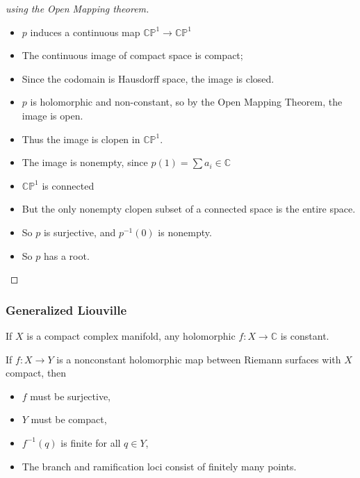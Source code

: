 \begin{proof}[using the Open Mapping theorem]

\envlist

\begin{itemize}
\tightlist
\item
  \(p\) induces a continuous map \({\mathbb{CP}}^1 \to {\mathbb{CP}}^1\)
\item
  The continuous image of compact space is compact;
\item
  Since the codomain is Hausdorff space, the image is closed.
\item
  \(p\) is holomorphic and non-constant, so by the Open Mapping Theorem,
  the image is open.
\item
  Thus the image is clopen in \({\mathbb{CP}}^1\).
\item
  The image is nonempty, since \(p(1) = \sum a_i \in {\mathbb{C}}\)
\item
  \({\mathbb{CP}}^1\) is connected
\item
  But the only nonempty clopen subset of a connected space is the entire
  space.
\item
  So \(p\) is surjective, and \(p^{-1}(0)\) is nonempty.
\item
  So \(p\) has a root.
\end{itemize}

\end{proof}

\hypertarget{generalized-liouville}{%
\subsubsection{Generalized Liouville}\label{generalized-liouville}}

\begin{theorem}

If \(X\) is a compact complex manifold, any holomorphic
\(f:X\to {\mathbb{C}}\) is constant.

\end{theorem}

\begin{lemma}[?]

If \(f:X\to Y\) is a nonconstant holomorphic map between Riemann
surfaces with \(X\) compact, then

\begin{itemize}
\tightlist
\item
  \(f\) must be surjective,
\item
  \(Y\) must be compact,
\item
  \(f^{-1}(q)\) is finite for all \(q\in Y\),
\item
  The branch and ramification loci consist of finitely many points.
\end{itemize}

\end{lemma}

